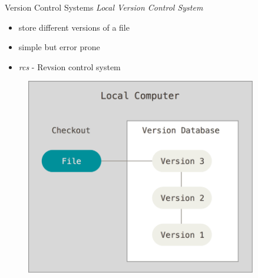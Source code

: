 \begin{frame}[fragile]{Version Control Systems}
    \emph{Local Version Control System}
    \vspace{1cm}

    \begin{minipage}{0.49\textwidth}
        \begin{itemize}
            \item store different versions of a file
            \item simple but error prone
            \item \emph{rcs} - Revsion control system
        \end{itemize}
    \end{minipage}
    \begin{minipage}{0.49\textwidth}
    \begin{figure}
        \centering
        \includegraphics[width=0.9\textwidth]{img/local_vcs.png}
    \end{figure}
    \end{minipage}

\end{frame}

